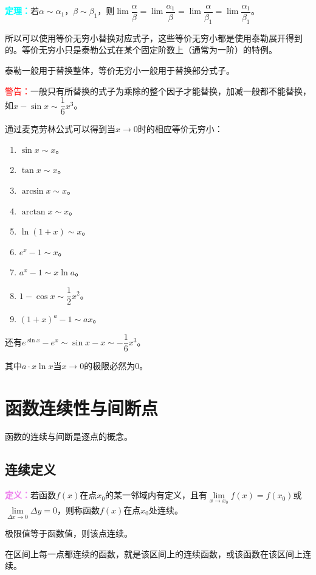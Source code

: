 \documentclass[UTF8, 12pt]{ctexart}
\begin{document}
\textcolor{aqua}{\textbf{定理：}}若$\alpha\sim\alpha_1$，$\beta\sim\beta_1$，则$\lim\dfrac{\alpha}{\beta}=\lim\dfrac{\alpha_1}{\beta}=\lim\dfrac{\alpha}{\beta_1}=\lim\dfrac{\alpha_1}{\beta_1}$。

所以可以使用等价无穷小替换对应式子，这些等价无穷小都是使用泰勒展开得到的。等价无穷小只是泰勒公式在某个固定阶数上（通常为一阶）的特例。

泰勒一般用于替换整体，等价无穷小一般用于替换部分式子。

\textcolor{red}{警告：}一般只有所替换的式子为乘除的整个因子才能替换，加减一般都不能替换，如$x-\sin x\sim\dfrac{1}{6}x^3$。

通过麦克劳林公式可以得到当$x\to 0$时的相应等价无穷小：

\begin{enumerate}
    \item $\sin x\sim x$。
    \item $\tan x\sim x$。
    \item $\arcsin x\sim x$。
    \item $\arctan x\sim x$。
    \item $\ln(1+x)\sim x$。
    \item $e^x-1\sim x$。
    \item $a^x-1\sim x\ln a$。
    \item $1-\cos x\sim\dfrac{1}{2}x^2$。
    \item $(1+x)^a-1\sim ax$。
\end{enumerate}

还有$e^{\sin x}-e^x\sim\sin x-x\sim-\dfrac{1}{6}x^3$。

其中$a\cdot x\ln x$当$x\to 0$的极限必然为0。

\section{函数连续性与间断点}

函数的连续与间断是逐点的概念。

\subsection{连续定义}

\textcolor{violet}{\textbf{定义：}}若函数$f(x)$在点$x_0$的某一邻域内有定义，且有$\lim\limits_{x\to x_0}f(x)=f(x_0)$或$\lim\limits_{\Delta x\to 0}\Delta y=0$，则称函数$f(x)$在点$x_0$处连续。

极限值等于函数值，则该点连续。

在区间上每一点都连续的函数，就是该区间上的连续函数，或该函数在该区间上连续。
\end{document}
